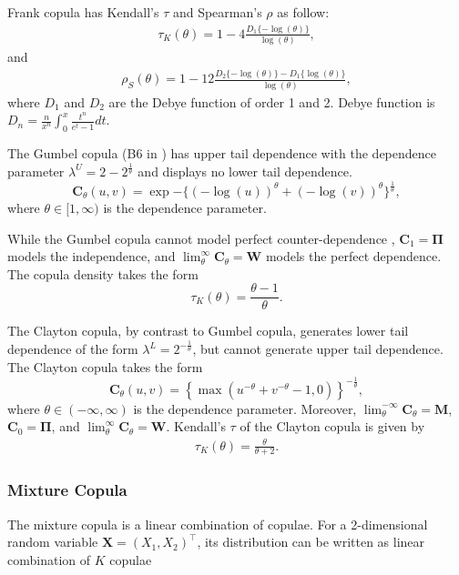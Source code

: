 Frank copula has Kendall's $\tau$ and Spearman's $\rho$ as follow:
\begin{align}
    \tau_K(\theta) = 1-4\frac{D_1\{-\log(\theta)\}}{\log(\theta)},
    \end{align}
and
\begin{align}
    \rho_S(\theta) = 1-12\frac{D_2\{-\log(\theta)\} - D_1\{\log(\theta)\}}{\log(\theta)},
    \end{align}
where $D_1$ and $D_2$ are the Debye function of order 1 and 2.
Debye function is $D_n = \frac{n}{x^n}\int_0^x\frac{t^n}{e^t-1}dt$.\medskip

The Gumbel copula (B6 in \citet{joe1997multivariate}) has upper tail
dependence with the dependence parameter $\lambda^U =
2-2^{\frac{1}{\theta}}$ and displays no lower tail dependence. 
\begin{equation*}
  \bm{C}_{\theta}(u,v) = \exp{-\{ (-\log(u))^\theta +(-\log(v))^\theta 
    \}^{\frac{1}{\theta}}},
\end{equation*}
where $\theta \in [1,\infty)$ is the dependence parameter.
    
While the Gumbel copula cannot model perfect counter-dependence
\citep{Nelsen2002}, $\bm{C}_{1} = \bm{\Pi}$ models the independence, 
and $\lim_\theta^\infty \bm{C}_\theta = \bm{W}$ models the perfect
dependence. The copula density takes the form
  \begin{equation*}
    \tau_K(\theta) =\frac{\theta-1}{\theta}. 
   \end{equation*}

The Clayton copula, by contrast to Gumbel copula,
generates lower tail dependence of the form $\lambda^L =
2^{-\frac{1}{\theta}}$, but cannot generate upper tail dependence.
The Clayton copula takes the form
\begin{equation*}
  \bm{C}_{\theta}(u,v) = \left\{
    \max(u^{-\theta}+v^{-\theta}-1,0)\right\}^{-\frac{1}{\theta}},
\end{equation*}
where $\theta \in (-\infty, \infty)$ is the dependence parameter.
Moreover, $\lim_\theta^{-\infty} \bm{C}_\theta = \bm{M}$, $\bm{C}_0 =
\bm{\Pi}$, and $\lim_\theta^\infty \bm{C}_\theta = \bm{W}$. 
Kendall's $\tau$ of the Clayton copula is given by 
\begin{align}
    \tau_K(\theta) =\frac{\theta}{\theta+2}.
    \end{align}

\subsubsection{Mixture Copula}\label{sec:mixture-copula}
The mixture copula is a linear combination of copulae. 
For a 2-dimensional random variable $\bm{X}=(X_1,X_2)^\top$,
its distribution can be written as linear combination of $K$ copulae

